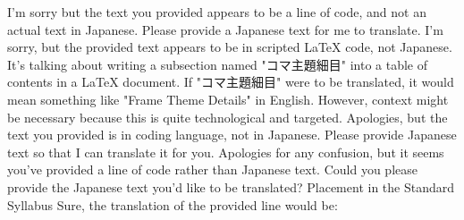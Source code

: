 \relax
\providecommand\hyper@newdestlabel[2]{}


I'm sorry but the text you provided appears to be a line of code, and not an actual text in Japanese. Please provide a Japanese text for me to translate.
I'm sorry, but the provided text appears to be in scripted LaTeX code, not Japanese. It's talking about writing a subsection named "コマ主題細目" into a table of contents in a LaTeX document. If "コマ主題細目" were to be translated, it would mean something like "Frame Theme Details" in English. However, context might be necessary because this is quite technological and targeted.
Apologies, but the text you provided is in coding language, not in Japanese. Please provide Japanese text so that I can translate it for you.
Apologies for any confusion, but it seems you've provided a line of code rather than Japanese text. Could you please provide the Japanese text you'd like to be translated?
Placement in the Standard Syllabus
Sure, the translation of the provided line would be:

